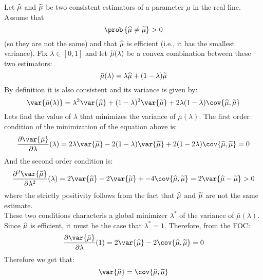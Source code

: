 \begin{solution}
    Let \(\widehat{\mu}\) and \(\widetilde{\mu}\) be two consistent estimators of a parameter \(\mu\) in the real line. Assume that 
    \[
        \prob\bc{\wh\mu \neq \wt\mu} > 0
    \]
    (so they are not the same) and that \(\widehat{\mu}\) is efficient (i.e., it has the smallest variance). Fix \(\lambda \in [0,1]\) and let \(\widetilde{\mu}(\lambda)\) be a convex combination between these two estimators:
    \[
        \bar\mu(\lambda) = \lambda \widehat{\mu} + (1-\lambda) \widetilde{\mu}
    \]
    By definition it is also consistent and its variance is given by:
    \[
        \var{\bar\mu(\lambda)} = \lambda^2 \var{\wh\mu} + (1-\lambda)^2 \var{\wt\mu} + 2\lambda(1-\lambda)\cov{\wh\mu, \wt\mu}
    \]  
    Lets find the value of \(\lambda\) that minimizes the variance of \(\bar\mu(\lambda)\). The first order condition of the minimization of the equation above is:
    \[
        \frac{\partial \var{\bar\mu}}{\partial \lambda}(\lambda) = 2\lambda \var{\wh\mu} - 2(1-\lambda) \var{\wt\mu} + 2(1-2\lambda)\cov{\wh\mu, \wt\mu} = 0
    \]
    And the second order condition is:
    \[
        \frac{\partial^2 \var{\bar\mu}}{\partial \lambda^2}(\lambda) = 2 \var{\wh\mu} - 2 \var{\wt\mu} + - 4\cov{\wh\mu, \wt\mu} = 2\var{\wh\mu-\wt\mu}> 0
    \]
    where the strictly positivity follows from the fact that \(\widehat{\mu}\) and \(\widetilde{\mu}\) are not the same estimate. \\
    These two conditions characteris a global minimizer \(\lambda^\ast\) of the variance of \(\bar\mu(\lambda)\). Since \(\widehat{\mu}\) is efficient, it must be the case that \(\lambda^\ast = 1\). Therefore, from the FOC:
    \[
        \frac{\partial \var{\bar\mu}}{\partial \lambda}(1) = 2\var{\wh\mu} - 2\cov{\wh\mu, \wt\mu} = 0
    \]
    Therefore we get that:
    \[
        \var{\wh\mu} = \cov{\wh\mu, \wt\mu}
    \]
\end{solution}
